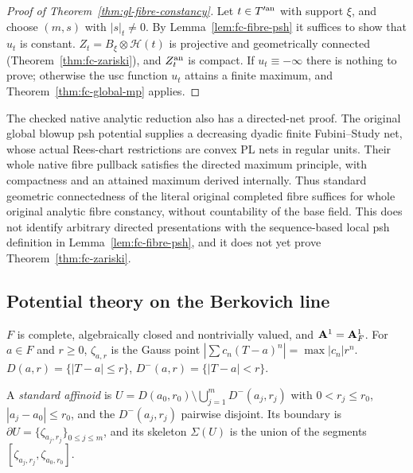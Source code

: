 \begin{proof}[Proof of Theorem~\ref{thm:gl-fibre-constancy}]
Let $t\in T'^{\mathrm{an}}$ with support $\xi$, and choose $(m,s)$ with $|s|_t\ne0$. By Lemma~\ref{lem:fc-fibre-psh} it suffices to show
that $u_t$ is constant. $Z_t=B_\xi\otimes\mathcal H(t)$ is projective and geometrically connected
(Theorem~\ref{thm:fc-zariski}), and $Z_t^{\mathrm{an}}$ is compact. If $u_t\equiv-\infty$ there is nothing to prove; otherwise the
usc function $u_t$ attains a finite maximum, and Theorem~\ref{thm:fc-global-mp} applies.
\end{proof}

\begin{remark}\label{rmk:fc-directed-analytic-route}
The checked native analytic reduction also has a directed-net proof. The original global
blowup psh potential supplies a decreasing dyadic finite Fubini--Study net, whose actual
Rees-chart restrictions are convex PL nets in regular units. Their whole native fibre
pullback satisfies the directed maximum principle, with compactness and an attained
maximum derived internally. Thus standard geometric connectedness of the literal original
completed fibre suffices for whole original analytic fibre constancy, without countability
of the base field. This does not identify arbitrary directed presentations with the
sequence-based local psh definition in Lemma~\ref{lem:fc-fibre-psh}, and it does not yet prove
Theorem~\ref{thm:fc-zariski}.
\end{remark}

\subsection{Potential theory on the Berkovich line}\label{subsec:fc-line}

\begin{convention}\label{conv:fc-line}
\notready
$F$ is complete, algebraically closed and nontrivially valued, and $\mathbf{A}^1=\mathbf{A}^1_F$. For $a\in F$ and $r\ge0$, $\zeta_{a,r}$ is
the Gauss point $|\sum c_n(T-a)^n|=\max|c_n|r^n$. $D(a,r)=\{|T-a|\le r\}$, $D^-(a,r)=\{|T-a|<r\}$.
\end{convention}

\begin{definition}\label{def:fc-standard-affinoid}
\leanok
{}
A \emph{standard affinoid} is $U=D(a_0,r_0)\setminus\bigcup_{j=1}^mD^-(a_j,r_j)$ with $0<r_j\le r_0$, $|a_j-a_0|\le r_0$, and the
$D^-(a_j,r_j)$ pairwise disjoint. Its boundary is $\partial U=\{\zeta_{a_j,r_j}\}_{0\le j\le m}$, and its skeleton $\Sigma(U)$ is
the union of the segments $[\zeta_{a_j,r_j},\zeta_{a_0,r_0}]$.
\end{definition}

